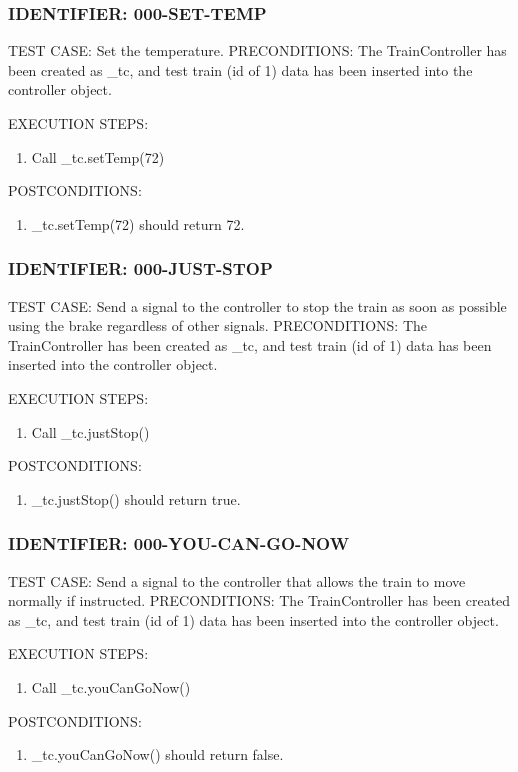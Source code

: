 \documentclass{scrreprt}
\begin{document}
\subsubsection{IDENTIFIER: 000-SET-TEMP}
TEST CASE: Set the temperature.
PRECONDITIONS: The TrainController has been created as _tc, and test train (id of 1) data has been inserted into the controller object.

EXECUTION STEPS:
\begin{enumerate}
	\item Call _tc.setTemp(72)
\end{enumerate}
POSTCONDITIONS:
\begin{enumerate}
	\item _tc.setTemp(72) should return 72.
\end{enumerate}

\subsubsection{IDENTIFIER: 000-JUST-STOP}
TEST CASE: Send a signal to the controller to stop the train as soon as possible using the brake regardless of other signals.
PRECONDITIONS: The TrainController has been created as _tc, and test train (id of 1) data has been inserted into the controller object.

EXECUTION STEPS:
\begin{enumerate}
	\item Call _tc.justStop()
\end{enumerate}
POSTCONDITIONS:
\begin{enumerate}
	\item _tc.justStop() should return true.
\end{enumerate}

\subsubsection{IDENTIFIER: 000-YOU-CAN-GO-NOW}
TEST CASE: Send a signal to the controller that allows the train to move normally if instructed.
PRECONDITIONS: The TrainController has been created as _tc, and test train (id of 1) data has been inserted into the controller object.

EXECUTION STEPS:
\begin{enumerate}
	\item Call _tc.youCanGoNow()
\end{enumerate}
POSTCONDITIONS:
\begin{enumerate}
	\item _tc.youCanGoNow() should return false.
\end{enumerate}
\end{document}
